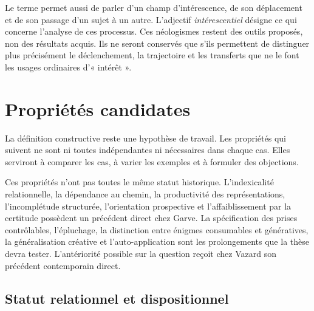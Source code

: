\documentclass[11pt,a4paper]{article}
\begin{document}
Le terme permet aussi de parler d'un champ d'intérescence, de son déplacement
et de son passage d'un sujet à un autre. L'adjectif \emph{intérescentiel} désigne
ce qui concerne l'analyse de ces processus. Ces néologismes restent des outils
proposés, non des résultats acquis. Ils ne seront conservés que s'ils permettent
de distinguer plus précisément le déclenchement, la trajectoire et les transferts
que ne le font les usages ordinaires d'« intérêt ».

\section{Propriétés candidates}

La définition constructive reste une hypothèse de travail. Les propriétés qui
suivent ne sont ni toutes indépendantes ni nécessaires dans chaque cas. Elles
serviront à comparer les cas, à varier les exemples et à formuler des objections.

Ces propriétés n'ont pas toutes le même statut historique. L'indexicalité
relationnelle, la dépendance au chemin, la productivité des représentations,
l'incomplétude structurée, l'orientation prospective et l'affaiblissement par
la certitude possèdent un précédent direct chez Garve. La spécification des
prises contrôlables, l'épluchage, la distinction entre énigmes consumables et
génératives, la généralisation créative et l'auto-application sont les
prolongements que la thèse devra tester. L'antériorité possible sur la
question reçoit chez Vazard son précédent contemporain direct.

\subsection{Statut relationnel et dispositionnel}
\end{document}
